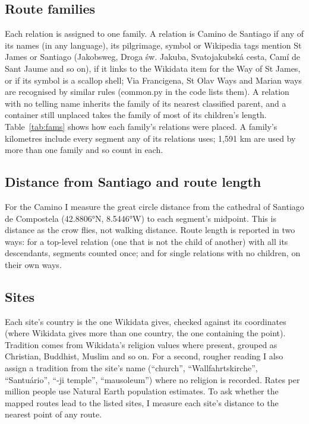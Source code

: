 \documentclass[11pt,a4paper]{article}
\begin{document}
\subsection{Route families}
Each relation is assigned to one family. A relation is Camino de Santiago if any of its names (in any language), its pilgrimage, symbol or Wikipedia tags mention St James or Santiago (Jakobsweg, Droga św. Jakuba, Svatojakubská cesta, Camí de Sant Jaume and so on), if it links to the Wikidata item for the Way of St James, or if its symbol is a scallop shell; Via Francigena, St Olav Ways and Marian ways are recognised by similar rules (common.py in the code lists them). A relation with no telling name inherits the family of its nearest classified parent, and a container still unplaced takes the family of most of its children's length. Table~\ref{tab:fams} shows how each family's relations were placed. A family's kilometres include every segment any of its relations uses; 1,591 km are used by more than one family and so count in each.

\subsection{Distance from Santiago and route length}
For the Camino I measure the great circle distance from the cathedral of Santiago de Compostela (42.8806°N, 8.5446°W) to each segment's midpoint. This is distance as the crow flies, not walking distance. Route length is reported in two ways: for a top-level relation (one that is not the child of another) with all its descendants, segments counted once; and for single relations with no children, on their own ways.

\subsection{Sites}
Each site's country is the one Wikidata gives, checked against its coordinates (where Wikidata gives more than one country, the one containing the point). Tradition comes from Wikidata's religion values where present, grouped as Christian, Buddhist, Muslim and so on. For a second, rougher reading I also assign a tradition from the site's name (``church'', ``Wallfahrtskirche'', ``Santuário'', ``-ji temple'', ``mausoleum'') where no religion is recorded. Rates per million people use Natural Earth population estimates. To ask whether the mapped routes lead to the listed sites, I measure each site's distance to the nearest point of any route.
\end{document}
